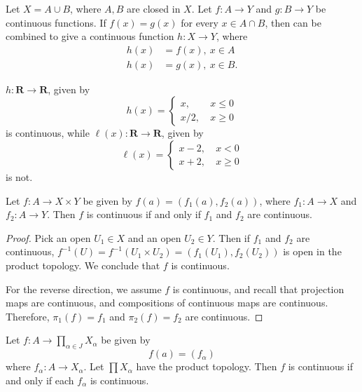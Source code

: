\begin{theorem}
\label{thm:pasting-lemma}
Let \(X = A \cup B\), where \(A,B\) are closed in \(X\). Let \(f: A \to Y\)
and \(g: B \to Y\) be continuous functions. If \(f(x) = g(x)\) for every
\(x \in A \cap B\), then can be combined  to give a continuous function
\(h: X \to Y\), where
\begin{align*}
h(x) & = f(x), \ x \in A \\
h(x) & = g(x), \ x \in B.
\end{align*}
\end{theorem}
\begin{example}
\(h: \mathbf{R} \to \mathbf{R}\), given by
\begin{equation*}
h(x) = \begin{cases}
x, \ & x \le 0 \\
x/2, \ & x \ge 0
\end{cases}
\end{equation*}
is continuous, while \(\ell(x): \mathbf{R} \to \mathbf{R}\), given by
\begin{equation*}
\ell(x) = \begin{cases}
x-2, \ & x < 0 \\
x+2, \ & x \ge 0
\end{cases}
\end{equation*}
is not.
\end{example}
\begin{theorem}
\label{thm:product-top-cont-via-proj}
Let \(f: A \to X \times Y\) be given by \(f(a) = (f_{1}(a), f_{2}(a))\),
where \(f_{1}: A \to X\) and \(f_{2}: A \to Y\).
Then \(f\) is continuous if and only if \(f_{1}\) and \(f_{2}\) are
continuous.
\end{theorem}
\begin{proof}
Pick an open \(U_{1} \in X\) and an open \(U_{2} \in Y\).
Then if \(f_{1}\) and \(f_{2}\) are continuous,
\(f^{-1}(U) = f^{-1}(U_{1} \times U_{2}) =
(f_{1}(U_{1}), f_{2}(U_{2}))\) is open in the product topology.
We conclude that \(f\) is continuous.

For the reverse direction, we assume \(f\) is continuous, and recall that
projection maps are continuous, and compositions of continuous maps are
continuous. Therefore, \(\pi_{1}(f) = f_{1}\)
and \(\pi_{2}(f) = f_{2}\) are continuous.
\end{proof}
\begin{theorem}
Let $f: A \to \prod_{\alpha \in J}X_\alpha$ be given by
\begin{equation*}
f(a) = (f_{\alpha})
\end{equation*}
where $f_{\alpha}: A \to X_{\alpha}$. Let $\prod X_{\alpha}$
have the product topology. Then $f$ is continuous if and only if
each $f_{\alpha}$ is continuous.
\end{theorem}
